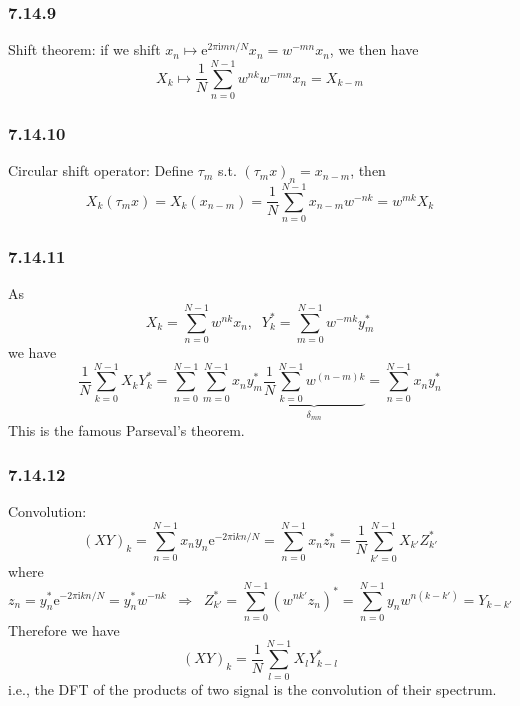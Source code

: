 \documentclass[]{ctexart}
\begin{document}
\subsubsection*{7.14.9}
Shift theorem: if we shift $x_n\mapsto \mathrm{e}^{2\pi\mathrm{i}mn/N}x_n=w^{-mn}x_n$, we then have 
\begin{equation*}
X_k\mapsto\frac{1}{N}\sum_{n=0}^{N-1}w^{nk}w^{-mn}x_n=X_{k-m}
\end{equation*}
\subsubsection*{7.14.10}
Circular shift operator: Define $\tau_m$ s.t. $(\tau_mx)_n=x_{n-m}$, then 
\begin{equation*}
X_k(\tau_m x)=X_k(x_{n-m})=\frac{1}{N}\sum_{n=0}^{N-1}x_{n-m}w^{-nk}=w^{mk}X_k
\end{equation*}
\subsubsection*{7.14.11}
As 
\begin{equation*}
X_k=\sum_{n=0}^{N-1}w^{nk}x_n,\;\;Y_k^*=\sum_{m=0}^{N-1}w^{-mk}y_m^*
\end{equation*}
we have 
\begin{equation*}
\frac{1}{N}\sum_{k=0}^{N-1}X_kY_k^*=\sum_{n=0}^{N-1}\sum_{m=0}^{N-1}x_n y_m^*\underbrace{\frac{1}{N}\sum_{k=0}^{N-1}w^{(n-m)k}}_{\delta_{mn}}=\sum_{n=0}^{N-1}x_ny_n^*
\end{equation*}
This is the famous Parseval's theorem. 
\subsubsection*{7.14.12}
Convolution: 
\begin{equation*}
(XY)_k=\sum_{n=0}^{N-1}x_ny_n\mathrm{e}^{-2\pi\mathrm{i}kn/N}=\sum_{n=0}^{N-1}x_nz_n^*=\frac{1}{N}\sum_{k'=0}^{N-1}X_{k'}Z_{k'}^*
\end{equation*}
where 
\begin{equation*}
z_n=y_n^*\mathrm{e}^{-2\pi\mathrm{i}kn/N}=y_n^*w^{-nk}\;\;\Rightarrow\;\;Z_{k'}^*=\sum_{n=0}^{N-1}(w^{nk'}z_n)^*=\sum_{n=0}^{N-1}y_nw^{n(k-k')}=Y_{k-k'}
\end{equation*}
Therefore we have 
\begin{equation*}
(XY)_k=\frac{1}{N}\sum_{l=0}^{N-1}X_{l}Y_{k-l}^*
\end{equation*}
i.e., the DFT of the products of two signal is the convolution of their spectrum. 
\end{document}
